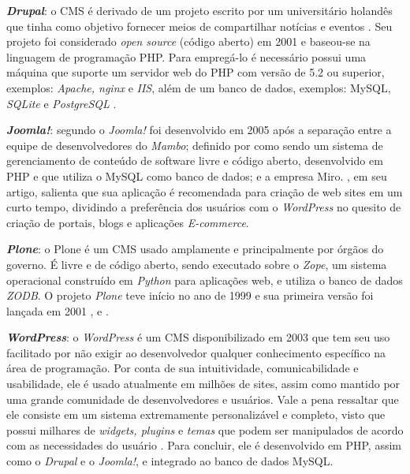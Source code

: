 \textbf{\textit{Drupal}}: o CMS é derivado de um projeto escrito por um universitário holandês que tinha como objetivo fornecer meios de compartilhar notícias e eventos \cite{menezes2016processo}. Seu projeto foi considerado \textit{open source} (código aberto) em 2001 e baseou-se na linguagem de programação PHP. Para empregá-lo é necessário possui uma máquina que suporte um servidor web do PHP com versão de 5.2 ou superior, exemplos: \textit{Apache, nginx} e \textit{IIS}, além de um banco de dados, exemplos: MySQL, \textit{SQLite} e \textit{PostgreSQL} \cite{tomlinson2010beginning}. 

\textbf{\textit{Joomla!}}: segundo  o \textit{Joomla!} foi desenvolvido em 2005 após a separação entre a equipe de desenvolvedores do \textit{Mambo}; definido por  como sendo um sistema de gerenciamento de conteúdo de software livre e código aberto, desenvolvido em PHP e que utiliza o MySQL como banco de dados; e a empresa Miro. , em seu artigo, salienta que sua aplicação é recomendada para criação de web sites em um curto tempo, dividindo a preferência dos usuários com o \textit{WordPress} no quesito de criação de portais, blogs e aplicações \textit{E-commerce}.

\textbf{\textit{Plone}}: o Plone é um CMS usado amplamente e principalmente por órgãos do governo. É livre e de código aberto, sendo executado sobre o \textit{Zope}, um sistema operacional construído em \textit{Python} para aplicações web, e utiliza o banco de dados \textit{ZODB}. O projeto \textit{Plone} teve início no ano de 1999 e sua primeira versão foi lançada em 2001 \cite{menezes2016processo}, \cite{elias} e \cite{dasoluccao}.


\textbf{\textit{WordPress}}: o \textit{WordPress} é um CMS disponibilizado em 2003 que tem seu uso facilitado por não exigir ao desenvolvedor qualquer conhecimento específico na área de programação. Por conta de sua intuitividade, comunicabilidade e usabilidade, ele é usado atualmente em milhões de sites, assim como mantido por uma grande comunidade de desenvolvedores e usuários. Vale a pena ressaltar que ele consiste em um sistema extremamente personalizável e completo, visto que possui milhares de \textit{widgets, plugins} e \textit{temas} que podem ser manipulados de acordo com as necessidades do usuário \cite{de2017repositorios}. Para concluir, ele é desenvolvido em PHP, assim como o \textit{Drupal} e o \textit{Joomla!}, e integrado ao banco de dados MySQL. 

